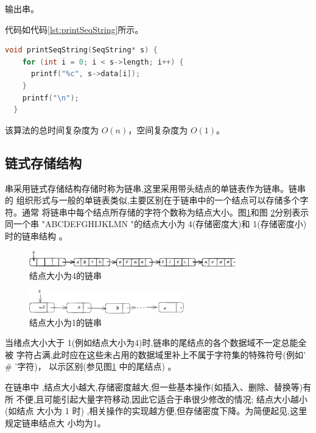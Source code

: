 \documentclass[lang=cn,newtx,10pt,scheme=chinese]{../elegantbook}
\begin{document}
输出串。

代码如代码\ref{lst:printSeqString}所示。

\begin{lstlisting}[language=C++, caption={输出串示例代码}, label={lst:printSeqString}]
  void printSeqString(SeqString* s) {
    for (int i = 0; i < s->length; i++) {
      printf("%c", s->data[i]);
    }
    printf("\n");
  }

\end{lstlisting}

该算法的总时间复杂度为 $O(n)$，空间复杂度为 $O(1)$。



\subsection{链式存储结构}

串采用链式存储结构存储时称为链串,这里采用带头结点的单链表作为链串。链串的
组织形式与一般的单链表类似,主要区别在于链串中的一个结点可以存储多个字符。通常
将链串中每个结点所存储的字符个数称为结点大小。图\ref{fig:linkStr_fourNodes}和图 \ref{fig:linkStr_oneNode}分别表示同一个串
"ABCDEFGHIJKLMN "的结点大小为 4(存储密度大)和 1(存储密度小)时的链串结构 。


\begin{figure}[!htbp]
  \centering
  \includegraphics[width=0.8\textwidth]{./figure/pdf/cropped/linkStr_fourNodes.pdf}
  \caption{结点大小为4的链串}
  \label{fig:linkStr_fourNodes}

\end{figure}

\begin{figure}[!htbp]
  \centering
  \includegraphics[width=0.6\textwidth]{./figure/pdf/cropped/linkStr_oneNode.pdf}
  \caption{结点大小为1的链串}
  \label{fig:linkStr_oneNode}

\end{figure}

当绪点大小大于 1(例如结点大小为4)时,链串的尾结点的各个数据域不一定总能全被
字符占满,此时应在这些未占用的数据域里补上不属于字符集的特殊符号(例如' \# '字符)，
以示区别(参见图\ref{fig:linkStr_fourNodes} 中的尾结点) 。

在链串中 ,结点大小越大,存储密度越大,但一些基本操作(如插入、删除、替换等)有所
不便,且可能引起大量字符移动,因此它适合于串很少修改的情况; 结点大小越小(如结点
大小为 1 时) ,相关操作的实现越方便,但存储密度下降。为简便起见,这里规定链串结点大
小均为1。
\end{document}
